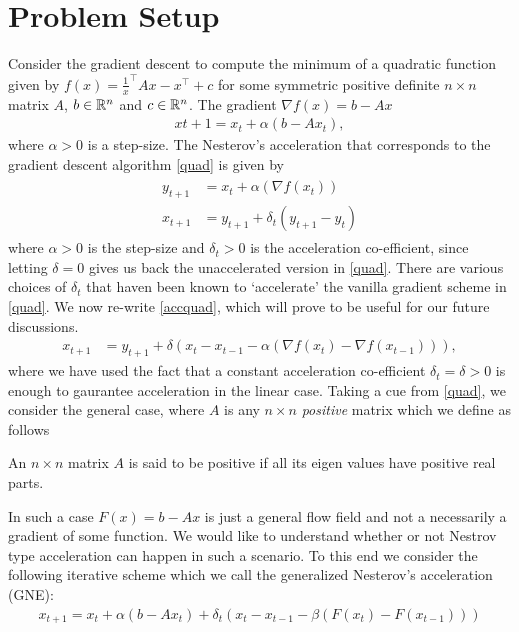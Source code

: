 \section{Problem Setup}
Consider the gradient descent to compute the minimum of a quadratic function given by $f(x)=\frac{1}x^\top A x-x^\top +c$ for some symmetric positive definite $n\times n$ matrix $A$, $b\in \mathbb{R}^n$ and $c\in\mathbb{R}^n$. The gradient $\nabla f(x)=b-Ax$
\begin{align}\label{quad}
x{t+1}=x_t+\alpha (b-Ax_t),
\end{align}
where $\alpha>0$ is a step-size. The Nesterov's acceleration that corresponds to the gradient descent algorithm \eqref{quad} is given by
\begin{align}\label{accquad}
\begin{split}
y_{t+1}&=x_t+\alpha(\nabla f(x_t))\\
x_{t+1}&=y_{t+1}+\delta_t(y_{t+1}-y_{t})
\end{split}
\end{align}
where $\alpha>0$ is the step-size and $\delta_t>0$ is the acceleration co-efficient, since letting $\delta=0$ gives us back the unaccelerated version in \eqref{quad}. There are various choices of $\delta_t$ that haven been known to `accelerate' the vanilla gradient scheme in \eqref{quad}. We now re-write \eqref{accquad}, which will prove to be useful for our future discussions.
\begin{align}\label{accquadrw}
x_{t+1}&=y_{t+1}+\delta(x_{t}-x_{t-1}-\alpha(\nabla f(x_t)-\nabla f(x_{t-1}))),
\end{align}
where we have used the fact that a constant acceleration co-efficient $\delta_t=\delta>0$ is enough to gaurantee acceleration in the linear case.
Taking a cue from \eqref{quad}, we consider the general case, where $A$ is any $n\times n$ \emph{positive} matrix which we define as follows
\begin{assumption}\label{pos}
An $n\times n$ matrix $A$ is said to be positive if all its eigen values have positive real parts.
\end{assumption}
In such a case $F(x)=b-Ax$ is just a general flow field and not a necessarily a gradient of some function. We would like to understand whether or not Nestrov type acceleration can happen in such a scenario. To this end we consider the following iterative scheme which we call the generalized Nesterov's acceleration (GNE):
\begin{align}\label{accgen}
x_{t+1}=x_t+\alpha(b-Ax_t)+\delta_t (x_t-x_{t-1}-\beta(F(x_t)-F(x_{t-1})) )
\end{align}
